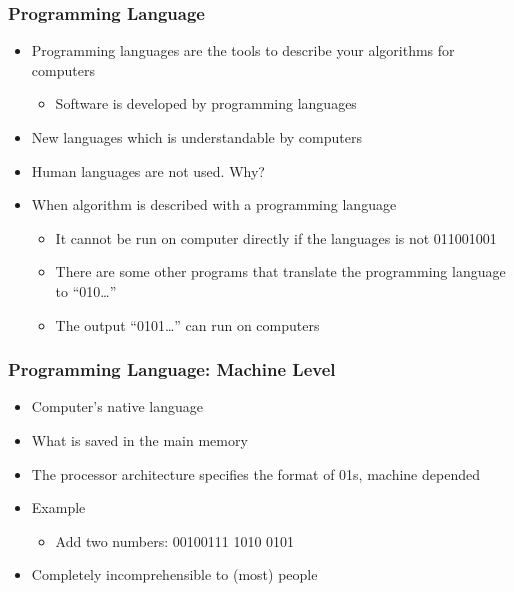 \documentclass{../c-lecture}
\begin{document}
\begin{frame}
  \frametitle{Programming Language}
  \begin{itemize}
    \item
      Programming languages are the tools to describe your algorithms for
      computers
    \begin{itemize}
      \item Software is developed by programming languages
    \end{itemize}
    \item New languages which is understandable by computers
    \item Human languages are not used. Why?
    \item When algorithm is described with a programming language
    \begin{itemize}
      \item
        It cannot be run on computer directly if the languages is not 011001001
      \item
        There are some other programs that translate the programming language to
        ``010\ldots''
      \item The output ``0101\ldots'' can run on computers
    \end{itemize}
  \end{itemize}
\end{frame}

\begin{frame}
  \frametitle{Programming Language: Machine Level}
  \begin{itemize}
    \item Computer’s native language
    \item What is saved in the main memory
    \item
      The processor architecture specifies the format of 01s, machine depended
    \item Example
    \begin{itemize}
      \item Add two numbers: 00100111 1010 0101
    \end{itemize}
    \item Completely incomprehensible to (most) people
  \end{itemize}
\end{frame}
\end{document}

